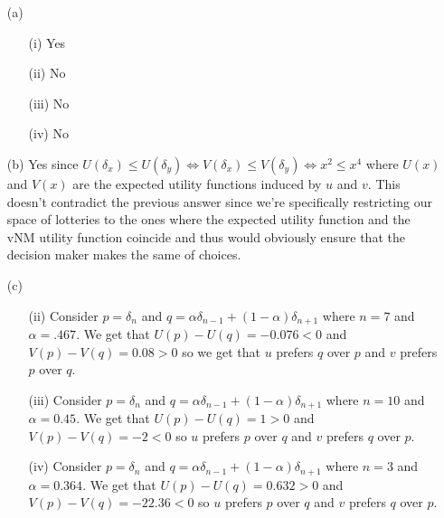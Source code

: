 \documentclass[11pt,oneside]{article}
\numberwithin{equation}{section}
\theoremstyle{definition}
\newcommand{\IFF}{\Longleftrightarrow}
\begin{document}
\begin{solution}



\begin{enumerate}

\item [(a)] 
\begin{enumerate}

\item [(i)] Yes
\item [(ii)] No
\item [(iii)] No
\item [(iv)] No



\end{enumerate}

\item[(b)] Yes since $U(\delta_x) \leq U(\delta_y) \IFF V(\delta_x) \leq V(\delta_y) \IFF x^2 \leq x^4$ where $U(x)$ and $V(x)$ are the expected utility functions induced by $u$ and $v$. This doesn't contradict the previous answer since we're specifically restricting our space of lotteries to the ones where the expected utility function and the vNM utility function coincide and thus would obviously ensure that the decision maker makes the same of choices. 

\item[(c)]  
\begin{enumerate}

\item [(ii)] Consider $p = \delta_n$ and $q = \alpha \delta_{n-1} + (1-\alpha) \delta_{n+1}$ where $n = 7$ and $\alpha = .467$. We get that $U(p) - U(q) = -0.076 < 0$ and $V(p) - V(q) = 0.08 > 0$ so we get that $u$ prefers $q$ over $p$ and $v$ prefers $p$ over $q$.  
\item [(iii)] Consider $p = \delta_n$ and $q = \alpha \delta_{n-1} + (1-\alpha) \delta_{n+1}$ where $n = 10$ and $\alpha = 0.45$. We get that $U(p) - U(q) = 1 > 0$ and $V(p) - V(q) = -2 < 0$ so $u$ prefers $p$ over $q$ and $v$ prefers $q$ over $p$. 
\item [(iv)] Consider $p = \delta_n$ and $q = \alpha \delta_{n-1} + (1-\alpha) \delta_{n+1}$ where $n =3$ and $\alpha = 0.364$. We get that $U(p) - U(q) = 0.632 > 0$ and $V(p) - V(q) = -22.36 < 0$ so $u$ prefers $p$ over $q$ and $v$ prefers $q$ over $p$.

\end{enumerate}


\end{enumerate}



\end{solution} 
\end{document}
